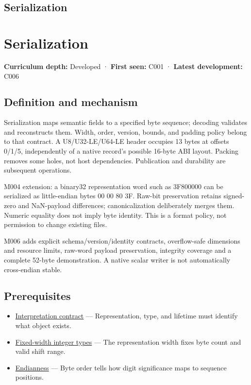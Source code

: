 \hypertarget{appendix-91d09ebed979}{}
\section*{Serialization}
\chapter{Serialization}\label{appendix-91d09ebed979-serialization}

\textbf{Curriculum depth:} Developed · \textbf{First seen:} C001 · \textbf{Latest development:} C006

\section{Definition and mechanism}\label{appendix-91d09ebed979-definition-and-mechanism}

Serialization maps semantic fields to a specified byte sequence; decoding validates and reconstructs them. Width, order, version, bounds, and padding policy belong to that contract. A U8/U32-LE/U64-LE header occupies 13 bytes at offsets 0/1/5, independently of a native record's possible 16-byte ABI layout. Packing removes some holes, not host dependencies. Publication and durability are subsequent operations.

M004 extension: a binary32 representation word such as 3F800000 can be serialized as little-endian bytes 00 00 80 3F. Raw-bit preservation retains signed-zero and NaN-payload differences; canonicalization deliberately merges them. Numeric equality does not imply byte identity. This is a format policy, not permission to change existing files.

M006 adds explicit schema/version/identity contracts, overflow-safe dimensions and resource limits, raw-word payload preservation, integrity coverage and a complete 52-byte demonstration. A native scalar writer is not automatically cross-endian stable.

\section{Prerequisites}\label{appendix-91d09ebed979-prerequisites}

\begin{itemize}
\tightlist
\item
  \hyperref[appendix-f414bd4ed05c]{Interpretation contract} --- Representation, type, and lifetime must identify what object exists.
\item
  \hyperref[appendix-cc04044b5782]{Fixed-width integer types} --- The representation width fixes byte count and valid shift range.
\item
  \hyperref[appendix-bc07c3d25b18]{Endianness} --- Byte order tells how digit significance maps to sequence positions.
\end{itemize}

